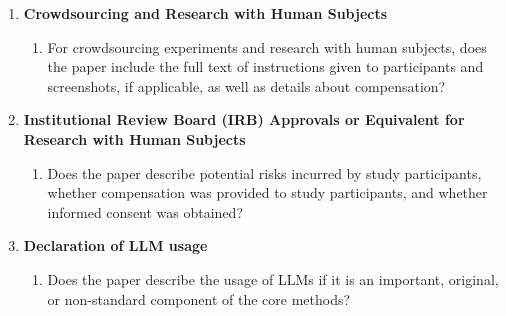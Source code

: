 \documentclass{article}
\begin{document}
\begin{enumerate}
\item {\bf Crowdsourcing and Research with Human Subjects}
    \begin{enumerate}
        \item For crowdsourcing experiments and research with human
              subjects, does the paper include the full text of instructions
              given to participants and screenshots, if applicable, as well
              as details about compensation?
    \end{enumerate}

\item {\bf Institutional Review Board (IRB) Approvals or Equivalent for
          Research with Human Subjects}
    \begin{enumerate}
        \item Does the paper describe potential risks incurred by study
              participants, whether compensation was provided to study
              participants, and whether informed consent was obtained?
    \end{enumerate}

\item {\bf Declaration of LLM usage}
    \begin{enumerate}
        \item Does the paper describe the usage of LLMs if it is an
              important, original, or non-standard component of the core
              methods?
    \end{enumerate}

\end{enumerate}
\fi
\end{document}
